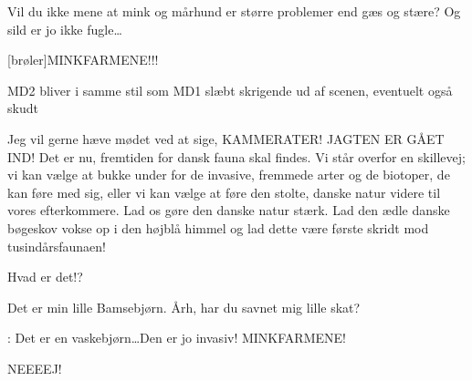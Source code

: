 \documentclass[a4paper,12pt]{article}
\begin{document}
\begin{sketch}
Vil du ikke mene at mink og mårhund er større problemer end gæs og stære? Og sild er jo ikke fugle\ldots

[brøler]MINKFARMENE!!!

\scene MD2 bliver i samme stil som MD1 slæbt skrigende ud af scenen, eventuelt også skudt

Jeg vil gerne hæve mødet ved at sige,  KAMMERATER! JAGTEN ER GÅET IND! Det er nu, fremtiden for dansk fauna skal findes. Vi står overfor en skillevej; vi kan vælge at bukke under for de invasive, fremmede arter og de biotoper, de kan føre med sig, eller vi kan vælge at føre den stolte, danske natur videre til vores efterkommere. Lad os gøre den danske natur stærk. Lad den ædle danske bøgeskov vokse op i den højblå himmel og lad dette være første skridt mod tusindårsfaunaen!



 Hvad er det!?

 Det er min lille Bamsebjørn. Årh, har du savnet mig lille skat?

: Det er en vaskebjørn\ldots Den er jo invasiv! MINKFARMENE!

 NEEEEJ!


\end{sketch}
\end{document}
